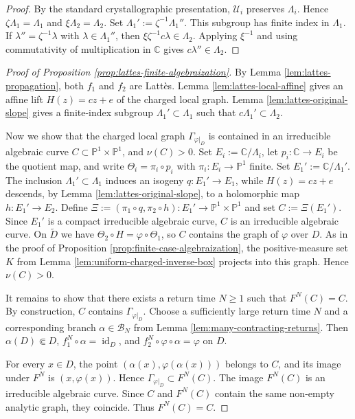 \documentclass[11pt]{amsart}
\numberwithin{equation}{section}
\theoremstyle{plain}
\theoremstyle{definition}
\theoremstyle{remark}
\begin{document}
\begin{proof}
\medskip

By the standard crystallographic presentation,
$\mathcal U_i$ preserves $\Lambda_i$. Hence
$\zeta\Lambda_1=\Lambda_1$ and
$\xi\Lambda_2=\Lambda_2$. Set
$\Lambda_1':=\zeta^{-1}\Lambda_1''$. This subgroup has finite index
in $\Lambda_1$. If $\lambda''=\zeta^{-1}\lambda$ with
$\lambda\in\Lambda_1''$, then
$\xi\zeta^{-1}c\lambda\in\Lambda_2$. Applying $\xi^{-1}$ and using
commutativity of multiplication in $\mathbb C$ gives
$c\lambda''\in\Lambda_2$.
\end{proof}

\begin{proof}[Proof of Proposition
\ref{prop:lattes-finite-algebraization}]
By Lemma \ref{lem:lattes-propagation}, both $f_1$ and $f_2$ are
Latt\`es. Lemma \ref{lem:lattes-local-affine} gives an affine lift
$H(z)=cz+e$ of the charged local graph. Lemma
\ref{lem:lattes-original-slope} gives a finite-index subgroup
$\Lambda_1'\subset\Lambda_1$ such that
$c\Lambda_1'\subset\Lambda_2$. 

Now we show that the charged local graph $\Gamma_{\varphi|_D}$ is contained in an
irreducible algebraic curve
$C\subset\mathbb P^1\times\mathbb P^1$, and $\nu(C)>0$. Set $E_i:=\mathbb C/\Lambda_i$, let
$p_i\colon\mathbb C\to E_i$ be the quotient map, and write
$\Theta_i=\pi_i\circ p_i$ with
$\pi_i\colon E_i\to\mathbb P^1$ finite. Set
$E_1':=\mathbb C/\Lambda_1'$. The inclusion
$\Lambda_1'\subset\Lambda_1$ induces an isogeny
$q\colon E_1'\to E_1$, while $H(z)=cz+e$ descends, by Lemma
\ref{lem:lattes-original-slope}, to a holomorphic map
$h\colon E_1'\to E_2$. Define
$\Xi:=(\pi_1\circ q,\pi_2\circ h)\colon
E_1'\to\mathbb P^1\times\mathbb P^1$ and set
$C:=\Xi(E_1')$. Since $E_1'$ is a compact irreducible
algebraic curve, $C$ is an irreducible algebraic curve.
On $\widetilde D$ we have
$\Theta_2\circ H=\varphi\circ\Theta_1$, so $C$ contains the graph of
$\varphi$ over $D$. As in the proof of Proposition
\ref{prop:finite-case-algebraization}, the positive-measure set $K$
from Lemma \ref{lem:uniform-charged-inverse-box} projects into this
graph. Hence $\nu(C)>0$.

It remains to show that there exists a return time $N\ge1$ such that $F^N(C)=C$. By construction, $C$ contains $\Gamma_{\varphi|_D}$. Choose a sufficiently large return time $N$ and a corresponding
branch $\alpha\in\mathscr B_N$ from Lemma
\ref{lem:many-contracting-returns}.
Then
$\alpha(D)\Subset D$, $f_1^N\circ\alpha=\operatorname{id}_D$, and
$f_2^N\circ\varphi\circ\alpha=\varphi$ on $D$.

For every $x\in D$, the point
$(\alpha(x),\varphi(\alpha(x)))$ belongs to $C$, and its image under
$F^N$ is $(x,\varphi(x))$. Hence
$\Gamma_{\varphi|_D}\subset F^N(C)$. The image $F^N(C)$ is an
irreducible algebraic curve. Since $C$ and $F^N(C)$ contain the same
non-empty analytic graph, they coincide. Thus $F^N(C)=C$.
\end{proof}
\end{document}
